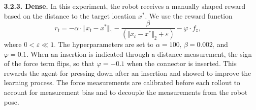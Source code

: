 \textbf{3.2.3. Dense. } In this experiment, the robot receives a manually shaped reward based on the distance to the target location $ x^{*}$. We use the reward function
\begin{equation}
r_t =  - \alpha \cdot {\Vert x_t - x^{*} \Vert}_1 -  \frac{\beta}{\left({\Vert x_t - x^{*} \Vert}_2 + \varepsilon\right)} - \varphi \cdot f_z,
\label{eq:shaped_reward_function}
\end{equation}
where $0 < \varepsilon \ll 1$. 
The hyperparameters are set to ${\alpha = 100}$, ${\beta = 0.002}$, and ${\varphi = 0.1}$. When an insertion is indicated through a distance measurement, the sign of the force term flips, so that $\varphi = -0.1$ when the connector is inserted. This rewards the agent for pressing down after an insertion and showed to improve the learning process.
The force measurements are calibrated before each rollout to account for measurement bias and to decouple the measurements from the robot pose. 
